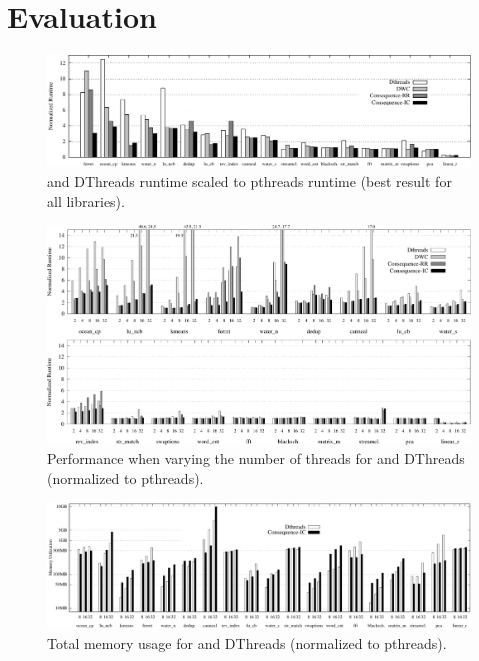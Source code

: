 \section{Evaluation}
\label{s:eval}

\begin{figure}
\includegraphics[width=6.0in]{figures/overall_runtimes.pdf}
\caption{\lib{} and DThreads runtime scaled to pthreads runtime (best result for all libraries).}
\label{f:performance}
\end{figure}


\begin{figure}
\includegraphics[width=6.4in]{figures/scalability_results.pdf}

\caption{Performance when varying the number of threads for \lib{} and DThreads (normalized to pthreads).}
\label{f:scalability}
\end{figure}


\begin{figure}
\includegraphics[width=6.4in]{figures/memory_utilization.pdf}
\caption{Total memory usage for {\lib{} and DThreads (normalized to pthreads).}}
\label{f:memory}
\end{figure}



